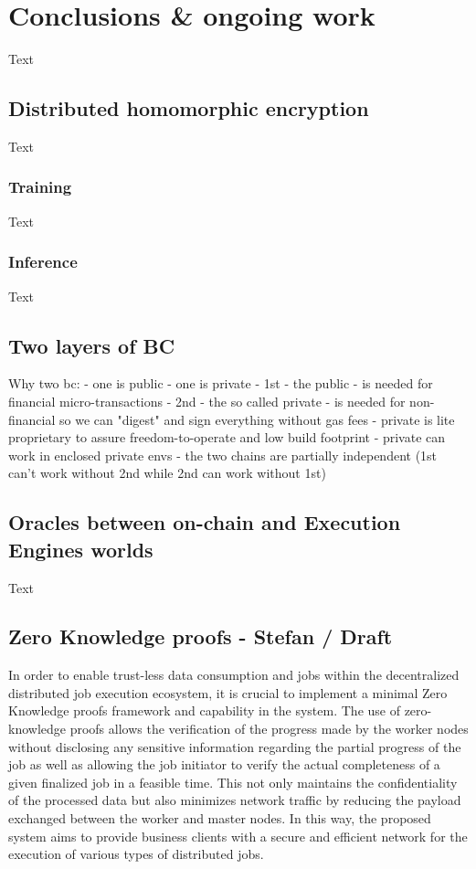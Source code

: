 \documentclass{article}
\begin{document}
\section{Conclusions \& ongoing work}
Text
\subsection{Distributed homomorphic encryption}
Text
\subsubsection{Training}
Text
\subsubsection{Inference}
Text

\subsection{Two layers of BC}

Why two bc:
- one is public 
- one is private
- 1st - the public - is needed for financial micro-transactions
- 2nd - the so called private - is needed for non-financial so we can "digest" and sign everything without gas fees
- private is lite proprietary to assure freedom-to-operate and low build footprint
- private can work in enclosed private envs 
- the two chains are partially independent (1st can't work without 2nd while 2nd can work without 1st)

\subsection{Oracles between on-chain and Execution Engines worlds}
Text

\subsection{Zero Knowledge proofs - Stefan / Draft}
In order to enable trust-less data consumption and jobs within the decentralized distributed job execution ecosystem, it is crucial to implement a minimal Zero Knowledge proofs \cite{goldwasser2019knowledge} framework and capability in the system. The use of zero-knowledge proofs allows the verification of the progress made by the worker nodes without disclosing any sensitive information regarding the partial progress of the job as well as allowing the job initiator to verify the actual completeness of a given finalized job in a feasible time. This not only maintains the confidentiality of the processed data but also minimizes network traffic by reducing the payload exchanged between the worker and master nodes. In this way, the proposed system aims to provide business clients with a secure and efficient network for the execution of various types of distributed jobs.
\end{document}
